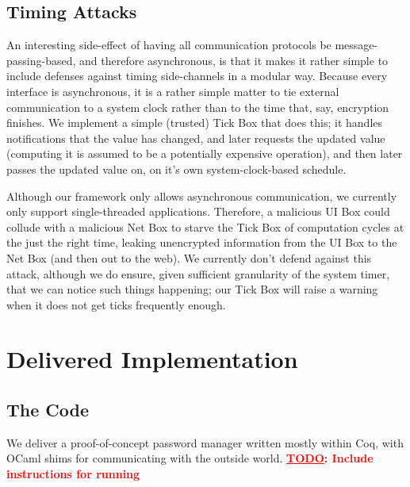 \documentclass{article}
\newcommand{\todo}[1]{\textbf{\textcolor{red}{\underline{TODO}: #1}}}
\begin{document}
\subsection{Timing Attacks}\label{sec:timing-details}
An interesting side-effect of having all communication protocols be message-passing-based, and therefore asynchronous, is that it makes it rather simple to include defenses against timing side-channels in a modular way.  Because every interface is asynchronous, it is a rather simple matter to tie external communication to a system clock rather than to the time that, say, encryption finishes.  We implement a simple (trusted) Tick Box that does this; it handles notifications that the value has changed, and later requests the updated value (computing it is assumed to be a potentially expensive operation), and then later passes the updated value on, on it's own system-clock-based schedule.

Although our framework only allows asynchronous communication, we currently only support single-threaded applications.  Therefore, a malicious UI Box could collude with a malicious Net Box to starve the Tick Box of computation cycles at the just the right time, leaking unencrypted information from the UI Box to the Net Box (and then out to the web).  We currently don't defend against this attack, although we do ensure, given sufficient granularity of the system timer, that we can notice such things happening; our Tick Box will raise a warning when it does not get ticks frequently enough.

\section{Delivered Implementation}
\subsection{The Code}
We deliver a proof-of-concept password manager written mostly within Coq, with OCaml shims for communicating with the outside world.  \todo{Include instructions for running}
\end{document}
